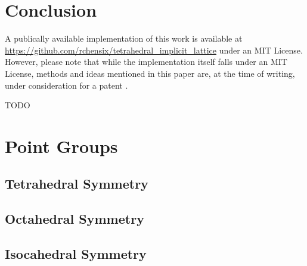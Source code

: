 \documentclass[acmtog]{acmart}
\begin{document}
\section{Conclusion}

A publically available implementation of this work is available at \url{https://github.com/rchensix/tetrahedral_implicit_lattice} under an MIT License. However, please note that while the implementation itself falls under an MIT License, methods and ideas mentioned in this paper are, at the time of writing, under consideration for a patent \cite{chen2022}.

\begin{acks}
TODO
\end{acks}




\appendix

\section{Point Groups}

\subsection{Tetrahedral Symmetry}
\label{sec:tetrahedral_symmetry}

\subsection{Octahedral Symmetry}

\subsection{Isocahedral Symmetry}
\end{document}
